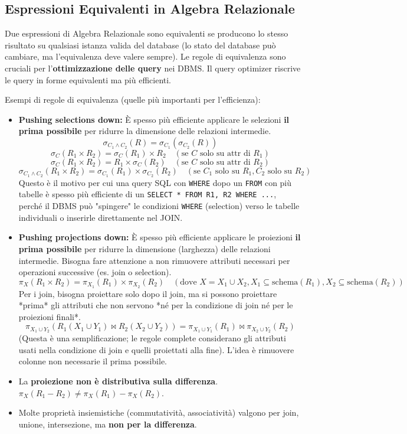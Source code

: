 \documentclass{article}
\newcommand{\selectop}[2]{\sigma_{#1}(#2)}
\newcommand{\project}[2]{\pi_{#1}(#2)}
\newcommand{\naturaljoin}{\Join}
\newcommand{\landop}{\wedge}
\begin{document}
	\subsection{Espressioni Equivalenti in Algebra Relazionale}
	Due espressioni di Algebra Relazionale sono equivalenti se producono lo stesso risultato su qualsiasi istanza valida del database (lo stato del database può cambiare, ma l'equivalenza deve valere sempre).
	Le regole di equivalenza sono cruciali per l'\textbf{ottimizzazione delle query} nei DBMS. Il query optimizer riscrive le query in forme equivalenti ma più efficienti.
	
	Esempi di regole di equivalenza (quelle più importanti per l'efficienza):
	\begin{itemize}
		\item \textbf{Pushing selections down:} È spesso più efficiente applicare le selezioni \textbf{il prima possibile} per ridurre la dimensione delle relazioni intermedie.
		$$ \selectop{C_1 \landop C_2}{R} = \selectop{C_1}{\selectop{C_2}{R}} $$
		$$ \selectop{C}{R_1 \times R_2} = \selectop{C}{R_1} \times R_2 \quad (\text{se } C \text{ solo su attr di } R_1) $$
		$$ \selectop{C}{R_1 \times R_2} = R_1 \times \selectop{C}{R_2} \quad (\text{se } C \text{ solo su attr di } R_2) $$
		$$ \selectop{C_1 \landop C_2}{R_1 \times R_2} = \selectop{C_1}{R_1} \times \selectop{C_2}{R_2} \quad (\text{se } C_1 \text{ solo su } R_1, C_2 \text{ solo su } R_2) $$
		Questo è il motivo per cui una query SQL con \texttt{WHERE} dopo un \texttt{FROM} con più tabelle è spesso più efficiente di un \texttt{SELECT * FROM R1, R2 WHERE ...}, perché il DBMS può "spingere" le condizioni \texttt{WHERE} (selection) verso le tabelle individuali o inserirle direttamente nel JOIN.
		\item \textbf{Pushing projections down:} È spesso più efficiente applicare le proiezioni \textbf{il prima possibile} per ridurre la dimensione (larghezza) delle relazioni intermedie. Bisogna fare attenzione a non rimuovere attributi necessari per operazioni successive (es. join o selection).
		$$ \project{X}{R_1 \times R_2} = \project{X_1}{R_1} \times \project{X_2}{R_2} \quad (\text{dove } X = X_1 \cup X_2, X_1 \subseteq \text{schema}(R_1), X_2 \subseteq \text{schema}(R_2)) $$
		Per i join, bisogna proiettare solo dopo il join, ma si possono proiettare *prima* gli attributi che non servono *né per la condizione di join né per le proiezioni finali*.
		$$ \project{X_1 \cup Y_2}{R_1(X_1 \cup Y_1) \naturaljoin R_2(X_2 \cup Y_2)} = \project{X_1 \cup Y_1}{R_1} \naturaljoin \project{X_2 \cup Y_2}{R_2} $$
		(Questa è una semplificazione; le regole complete considerano gli attributi usati nella condizione di join e quelli proiettati alla fine). L'idea è rimuovere colonne non necessarie il prima possibile.
		\item La \textbf{proiezione non è distributiva sulla differenza}. $\pi_X(R_1 - R_2) \neq \pi_X(R_1) - \pi_X(R_2)$.
		\item Molte proprietà insiemistiche (commutatività, associatività) valgono per join, unione, intersezione, ma \textbf{non per la differenza}.
	\end{itemize}
\end{document}
